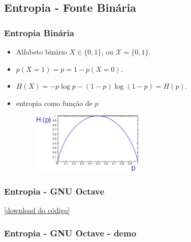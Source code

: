 \subsection{Entropia - Fonte Binária}
\begin{frame}%
  \frametitle{Entropia Binária}
  \begin{itemize}
  \item Alfabeto binário $X \in \{0,1\}$, ou $\mathcal{X} = \{0,1\}$.
  \item $p(X=1)=p=1-p(X=0)$.
  \item $H(X) = -p \log p - (1-p) \log (1-p) = H(p)$.
  \item entropia como função de $p$

  \begin{figure}[h!]
  \centering
  \includegraphics[width=0.5\textwidth]{images/graph_Hp.pdf}
  \label{fig:graph_Hp}
  \end{figure}
  \end{itemize}
\end{frame}


\begin{frame}%
  \frametitle{Entropia - GNU Octave}
  

  \href{https://raw.githubusercontent.com/leolca/clscripts/master/entropy.m}{[download do código]}
\end{frame}

\begin{frame}%
  \frametitle{Entropia - GNU Octave - demo}
  
\end{frame}


